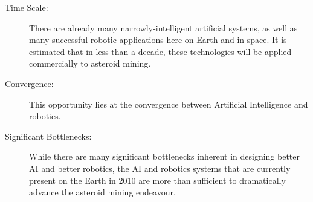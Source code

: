 \begin{description}
\item[Time Scale:]

There are already many narrowly-intelligent artificial systems, as
well as many successful robotic applications here on Earth and in
space. It is estimated that in less than a decade, these technologies
will be applied commercially to asteroid mining.


\item[Convergence:]

This opportunity lies at the convergence between Artificial Intelligence
and robotics.


\item[Significant Bottlenecks:]

While there are many significant bottlenecks inherent in designing
better AI and better robotics, the AI and robotics systems that are
currently present on the Earth in 2010 are more than sufficient to
dramatically advance the asteroid mining endeavour.
\end{description}
 
